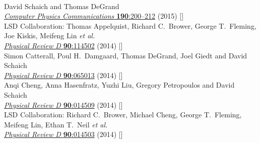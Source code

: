 \begin{spacelist}
\begin{revnumerate}
    \pagebreakitem
       \\
      David Schaich and Thomas DeGrand \\
      \href{https://doi.org/10.1016/j.cpc.2014.12.025}{\textit{Computer Physics Communications} \textbf{190}:200--212} (2015) []
    \pagebreakitem
       \\
      LSD Collaboration: Thomas Appelquist, Richard C.~Brower, George T.~Fleming, Joe Kiskis, Meifeng Lin \textit{et al.} \\ %
      \href{https://doi.org/10.1103/PhysRevD.90.114502}{\textit{Physical Review D} \textbf{90}:114502} (2014) []
    \pagebreakitem
       \\
      Simon Catterall, Poul H.~Damgaard, Thomas DeGrand, Joel Giedt and David Schaich \\
      \href{https://doi.org/10.1103/PhysRevD.90.065013}{\textit{Physical Review D} \textbf{90}:065013} (2014) []
    \pagebreakitem
       \\
      Anqi Cheng, Anna Hasenfratz, Yuzhi Liu, Gregory Petropoulos and David Schaich \\
      \href{https://doi.org/10.1103/PhysRevD.90.014509}{\textit{Physical Review D} \textbf{90}:014509} (2014) []
    \pagebreakitem
       \\
      LSD Collaboration: Richard C.~Brower, Michael Cheng, George T.~Fleming, Meifeng Lin, Ethan T.~Neil \textit{et al.} \\ %
      \href{https://doi.org/10.1103/PhysRevD.90.014503}{\textit{Physical Review D} \textbf{90}:014503} (2014) []%
    \pagebreakitem
       \\

\end{revnumerate}
\end{spacelist}
